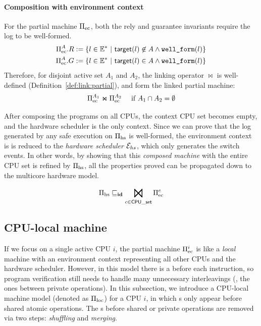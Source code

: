 \paragraph{Composition with environment context}
For the partial machine $\Pi_{\text{ec}}$,
both the rely and guarantee invariants
require the log to be well-formed.
\begin{align*}
\Pi_{\text{ec}}^A.R := \{ l \in \mathbb{E}^* \ |\ {\mathsf{target}}(l) \not\in A
\land {\texttt{well\_form}}(l) \} \\
\Pi_{\text{ec}}^A.G := \{ l \in \mathbb{E}^* \ |\ {\mathsf{target}}(l) \in A
\land {\texttt{well\_form}}(l) \}
\end{align*}
Therefore, for disjoint active set $A_1$ and $A_2$,
the linking operator $\Join$ is well-defined 
(\cf Definition~\ref{def:link:partial}),
and form the linked partial machine:
\[\Pi_{\text{ec}}^{A_1} \Join \Pi_{\text{ec}}^{A_2}
\quad \text{ if } A_1 \cap A_2 = \emptyset\]

After composing the programs on all CPUs, the context CPU set becomes
empty, and the hardware scheduler is the only context.
Since we can prove that the log generated
by any safe execution on $\Pi_{\text{hs}}$
is well-formed,
the environment context is  is
reduced to the \emph{hardware scheduler}
$\mathcal{E}_{hs}$, which only generates the
switch events. In other words, by
showing that this \emph{composed machine} with the entire CPU set
is refined by $\Pi_{\text{hs}}$, 
all the properties proved can be propagated down to the
multicore hardware model.

\begin{lemma}
\[\mach{hs} \refines_\id \bigJoin_{c\in\comm{CPU\_set}}
\mach{ec}^{c}\]
\end{lemma}


\subsection{CPU-local machine}
\label{subsec:spec:seq}
If we focus on a single active CPU $i$,
the partial machine $\Pi_{\text{ec}}^i$ is like a \emph{local} machine
with an environment context representing all other CPUs
and the hardware scheduler. However,
in this model there is a {\intptext} before each instruction,
so program verification still needs to handle many unnecessary 
interleavings (\eg, the ones between private operations).
In this subsection, we introduce a CPU-local
machine model (denoted as $\Pi_{\text{loc}}$) for a CPU $i$, in which {\intptext}s
only appear before shared atomic operations.
The {\intptext}s before shared or private operations
are removed via two steps: \emph{shuffling} and \emph{merging}.

